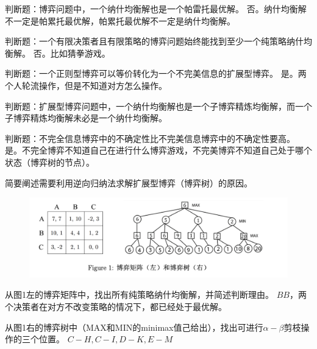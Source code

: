 \begin{problem}
	判断题：博弈问题中，一个纳什均衡解也是一个帕雷托最优解。
	\solution 否。纳什均衡解不一定是帕累托最优解，帕累托最优解不一定是纳什均衡解。
\end{problem}

\begin{problem}
	判断题：一个有限决策者且有限策略的博弈问题始终能找到至少一个纯策略纳什均衡解。
	\solution 否。比如猜拳游戏。
\end{problem}

\begin{problem}
	判断题：一个正则型博弈可以等价转化为一个不完美信息的扩展型博弈。
	\solution 是。两个人轮流操作，但是不知道对方怎么操作。
\end{problem}

\begin{problem}[\todo]
	判断题：扩展型博弈问题中，一个纳什均衡解也是一个子博弈精炼均衡解，而一个子博弈精炼均衡解未必是一个纳什均衡解。
	\solution 
\end{problem}

\begin{problem}
	判断题：不完全信息博弈中的不确定性比不完美信息博弈中的不确定性要高。
	\solution 是。不完全博弈不知道自己在进行什么博弈游戏，不完美博弈不知道自己处于哪个状态（博弈树的节点）。
\end{problem}

\begin{problem}[\todo]
	简要阐述需要利用逆向归纳法求解扩展型博弈（博弈树）的原因。
\end{problem}

\begin{figure}[htbp]
	\centering
	\includegraphics[width=1\textwidth]{./figure/fig1.png}
\end{figure}

\begin{problem}
	从图1左的博弈矩阵中，找出所有纯策略纳什均衡解，并简述判断理由。
	\solution $BB$，两个决策者在对方不改变策略的情况下，都已经处于最优解。
\end{problem}

\begin{problem}
	从图1右的博弈树中（MAX和MIN的minimax值己给出），找出可进行$\alpha-\beta$剪枝操作的三个位置。
	\solution $C-H,C-I,D-K,E-M$
\end{problem}

